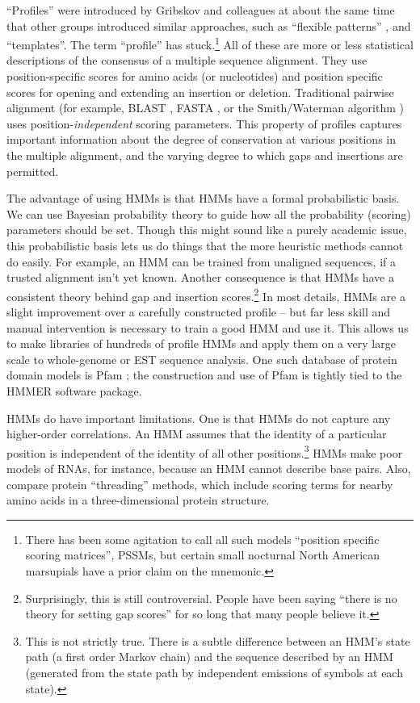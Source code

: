``Profiles'' were introduced by Gribskov and colleagues
\cite{Gribskov87,Gribskov90} at about the same time
that other groups introduced similar approaches, such as ``flexible
patterns'' \cite{Barton90}, and
``templates''\cite{Bashford87,Taylor86}. The term ``profile'' has
stuck.\footnote{There has been some agitation to call all such models
``position specific scoring matrices'', PSSMs, but certain small
nocturnal North American marsupials have a prior claim on the
mnemonic.}  All of these are more or less statistical descriptions of
the consensus of a multiple sequence alignment. They use
position-specific scores for amino acids (or nucleotides) and position
specific scores for opening and extending an insertion or deletion.
Traditional pairwise alignment (for example, BLAST
\cite{Altschul90}, FASTA \cite{Pearson88}, or the Smith/Waterman
algorithm \cite{Smith81}) uses position-{\em independent} scoring
parameters. This property of profiles captures important information
about the degree of conservation at various positions in the multiple
alignment, and the varying degree to which gaps and insertions are
permitted.

The advantage of using HMMs is that HMMs have a formal probabilistic
basis. We can use Bayesian probability theory to guide how all the
probability (scoring) parameters should be set. Though this might
sound like a purely academic issue, this probabilistic basis lets us
do things that the more heuristic methods cannot do easily. For
example, an HMM can be trained from unaligned sequences, if a trusted
alignment isn't yet known. Another consequence is that HMMs have a
consistent theory behind gap and insertion scores.\footnote{
Surprisingly, this is still controversial.  People have been saying
``there is no theory for setting gap scores'' for so long that many
people believe it.} In most details, HMMs are a slight improvement
over a carefully constructed profile -- but far less skill and manual
intervention is necessary to train a good HMM and use it.  This allows
us to make libraries of hundreds of profile HMMs and apply them on a
very large scale to whole-genome or EST sequence analysis.  One such
database of protein domain models is Pfam \cite{Sonnhammer97}; the
construction and use of Pfam is tightly tied to the HMMER software
package.

HMMs do have important limitations. One is that HMMs do not capture
any higher-order correlations.  An HMM assumes that the identity of a
particular position is independent of the identity of all other
positions.\footnote{This is not strictly true. There is a subtle
difference between an HMM's state path (a first order Markov chain)
and the sequence described by an HMM (generated from the state path by
independent emissions of symbols at each state).} HMMs make poor
models of RNAs, for instance, because an HMM cannot describe base
pairs. Also, compare protein ``threading'' methods, which include
scoring terms for nearby amino acids in a three-dimensional protein
structure. 

